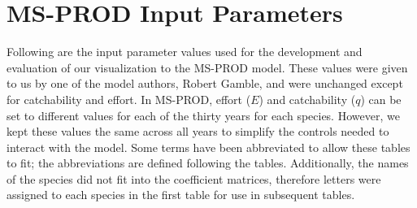 \chapter{MS-PROD Input Parameters}

Following are the input parameter values used for the development and evaluation of our visualization to the MS-PROD model.  These values were given to us by one of the model authors, Robert Gamble, and were unchanged except for catchability and effort.  In MS-PROD, effort ($E$) and catchability ($q$) can be set to different values for each of the thirty years for each species.  However, we kept these values the same across all years to simplify the controls needed to interact with the model.  Some terms have been abbreviated to allow these tables to fit; the abbreviations are defined following the tables.  Additionally, the names of the species did not fit into the coefficient matrices, therefore letters were assigned to each species in the first table for use in subsequent tables.


{
}


